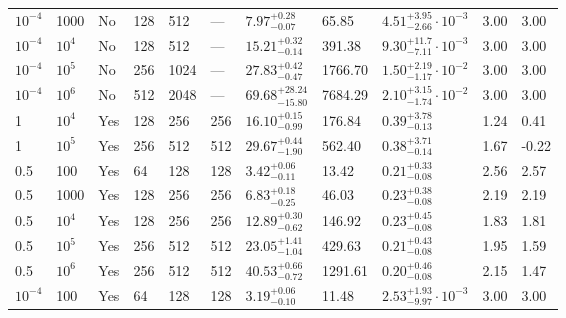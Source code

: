 \begin{table}
\begin{center}
{\begin{tabular}{ p{1cm} p{1cm} p{1cm} p{1cm} p{1cm} p{1cm} p{1.75cm} p{1.5cm} p{2.75cm} p{1cm} p{1.2cm}  }
\vspace{0.08cm}$10^{-4}$	&	1000	&	No	&	128	&	512	&	---	&$	7.97	_{-	0.07	}^{+	0.28	}$&	65.85	&$	4.51	_{-	2.66	}^{+	3.95}\cdot 10^{-3}	$&	3.00	&	3.00	\\
\vspace{0.08cm}$10^{-4}$	&	$10^4$	&	No	&	128	&	512	&	---	&$	15.21	_{-	0.14	}^{+	0.32	}$&	391.38	&$	9.30	_{-	7.11	}^{+	11.7}\cdot 10^{-3}	$&	3.00	&	3.00	\\
\vspace{0.08cm}$10^{-4}$	&	$10^5$	&	No	&	256	&	1024	&	---	&$	27.83	_{-	0.47	}^{+	0.42	}$&	1766.70	&$	1.50	_{-	1.17	}^{+	2.19}\cdot 10^{-2}	$&	3.00	&	3.00	\\
\vspace{0.08cm}$10^{-4}$	&	$10^6$	&	No	&	512	&	2048	&	---	&$	69.68	_{-	15.80	}^{+	28.24	}$&	7684.29	&$	2.10	_{-	1.74	}^{+	3.15}\cdot 10^{-2}	$&	3.00	&	3.00	\\
\vspace{0.08cm}1	&	$10^4$	&	Yes	&	128	&	256	&	256	&$	16.10	_{-	0.99	}^{+	0.15	}$&	176.84	&$	0.39	_{-	0.13	}^{+	3.78	}$&	1.24	&	0.41	\\
\vspace{0.08cm}1	&	$10^5$	&	Yes	&	256	&	512	&	512	&$	29.67	_{-	1.90	}^{+	0.44	}$&	562.40	&$	0.38	_{-	0.14	}^{+	3.71	}$&	1.67	&	-0.22	\\
\vspace{0.08cm}0.5	&	100	&	Yes	&	64	&	128	&	128	&$	3.42	_{-	0.11	}^{+	0.06	}$&	13.42	&$	0.21	_{-	0.08	}^{+	0.33	}$&	2.56	&	2.57	\\
\vspace{0.08cm}0.5	&	1000	&	Yes	&	128	&	256	&	256	&$	6.83	_{-	0.25	}^{+	0.18	}$&	46.03	&$	0.23	_{-	0.08	}^{+	0.38	}$&	2.19	&	2.19	\\
\vspace{0.08cm}0.5	&	$10^4$	&	Yes	&	128	&	256	&	256	&$	12.89	_{-	0.62	}^{+	0.30	}$&	146.92	&$	0.23	_{-	0.08	}^{+	0.45	}$&	1.83	&	1.81	\\
\vspace{0.08cm}0.5	&	$10^5$	&	Yes	&	256	&	512	&	512	&$	23.05	_{-	1.04	}^{+	1.41	}$&	429.63	&$	0.21	_{-	0.08	}^{+	0.43	}$&	1.95	&	1.59	\\
\vspace{0.08cm}0.5	&	$10^6$	&	Yes	&	256	&	512	&	512	&$	40.53	_{-	0.72	}^{+	0.66	}$&	1291.61	&$	0.20	_{-	0.08	}^{+	0.46	}$&	2.15	&	1.47	\\
\vspace{0.08cm}$10^{-4}$	&	100	&	Yes	&	64	&	128	&	128	&$	3.19	_{-	0.10	}^{+	0.06	}$&	11.48	&$	2.53	_{-	9.97	}^{+	1.93}\cdot 10^{-3}	$&	3.00	&	3.00	\\

\end{tabular}}
\end{center}
\end{table}
